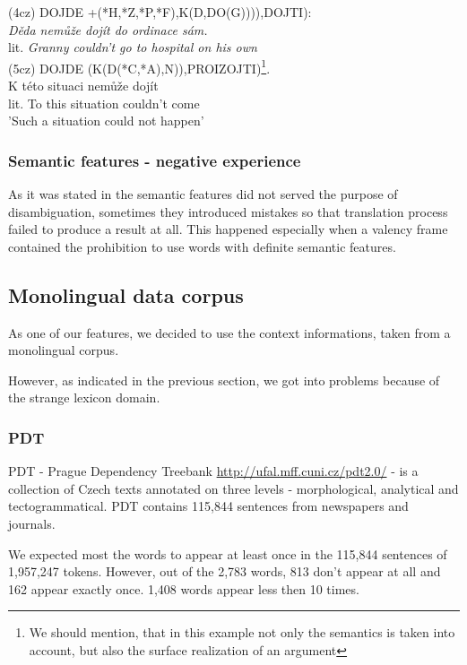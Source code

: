 \documentclass[letterpaper]{article}
\newcommand{\todofn}[1] {
 \footnote{\textbf{TODO : #1}}}
\begin{document}
(4cz) DOJDE +(*H,*Z,*P,*F),K(D,DO(G)))),DOJTI):\\
\textit{Děda nemůže dojít do ordinace sám.}\\
lit. \textit{Granny couldn't go to hospital on his own}\\

(5cz) DOJDE (K(D(*C,*A),N)),PROIZOJTI)\footnote{We should mention, that in this example
not only the semantics is taken into account, but also the surface realization of an argument}.\\
K této situaci nemůže dojít\\
lit. To this situation couldn't come\\
'Such a situation could not happen'

\subsubsection{Semantic features - negative experience}
As it was stated in \cite{KubonPHD2001} the semantic features did not
served the purpose of disambiguation, sometimes they introduced mistakes
so that translation process failed to produce a result at all. This
happened especially when a valency frame contained the prohibition
to use words with definite semantic features.



\subsection{Monolingual data corpus}
As one of our features, we decided to use the context informations, taken from a monolingual corpus.

However, as indicated in the previous section, we got into problems because of the strange lexicon domain.
\subsubsection{PDT}
PDT - Prague Dependency Treebank \url{http://ufal.mff.cuni.cz/pdt2.0/} - is a collection of Czech texts annotated on three
levels - morphological, analytical and tectogrammatical.   
PDT contains 115,844 sentences from newspapers and journals.

We expected most the words to appear at least once in the 115,844 sentences of 1,957,247 tokens. 
However, out of the 2,783 words, 813 don't appear at all and 162 appear exactly once. 
1,408 words appear less then 10 times.
\end{document}
